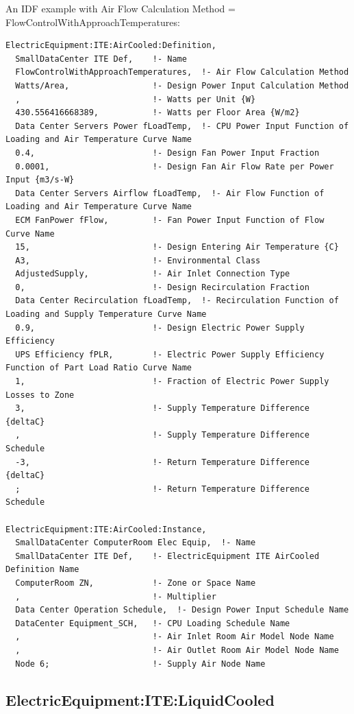An IDF example with Air Flow Calculation Method = FlowControlWithApproachTemperatures:

\begin{lstlisting}
ElectricEquipment:ITE:AirCooled:Definition,
  SmallDataCenter ITE Def,    !- Name
  FlowControlWithApproachTemperatures,  !- Air Flow Calculation Method
  Watts/Area,                 !- Design Power Input Calculation Method
  ,                           !- Watts per Unit {W}
  430.556416668389,           !- Watts per Floor Area {W/m2}
  Data Center Servers Power fLoadTemp,  !- CPU Power Input Function of Loading and Air Temperature Curve Name
  0.4,                        !- Design Fan Power Input Fraction
  0.0001,                     !- Design Fan Air Flow Rate per Power Input {m3/s-W}
  Data Center Servers Airflow fLoadTemp,  !- Air Flow Function of Loading and Air Temperature Curve Name
  ECM FanPower fFlow,         !- Fan Power Input Function of Flow Curve Name
  15,                         !- Design Entering Air Temperature {C}
  A3,                         !- Environmental Class
  AdjustedSupply,             !- Air Inlet Connection Type
  0,                          !- Design Recirculation Fraction
  Data Center Recirculation fLoadTemp,  !- Recirculation Function of Loading and Supply Temperature Curve Name
  0.9,                        !- Design Electric Power Supply Efficiency
  UPS Efficiency fPLR,        !- Electric Power Supply Efficiency Function of Part Load Ratio Curve Name
  1,                          !- Fraction of Electric Power Supply Losses to Zone
  3,                          !- Supply Temperature Difference {deltaC}
  ,                           !- Supply Temperature Difference Schedule
  -3,                         !- Return Temperature Difference {deltaC}
  ;                           !- Return Temperature Difference Schedule

ElectricEquipment:ITE:AirCooled:Instance,
  SmallDataCenter ComputerRoom Elec Equip,  !- Name
  SmallDataCenter ITE Def,    !- ElectricEquipment ITE AirCooled Definition Name
  ComputerRoom ZN,            !- Zone or Space Name
  ,                           !- Multiplier
  Data Center Operation Schedule,  !- Design Power Input Schedule Name
  DataCenter Equipment_SCH,   !- CPU Loading Schedule Name
  ,                           !- Air Inlet Room Air Model Node Name
  ,                           !- Air Outlet Room Air Model Node Name
  Node 6;                     !- Supply Air Node Name
\end{lstlisting}

\subsection{ElectricEquipment:ITE:LiquidCooled}\label{electricequipmentiteliquidcooled}

